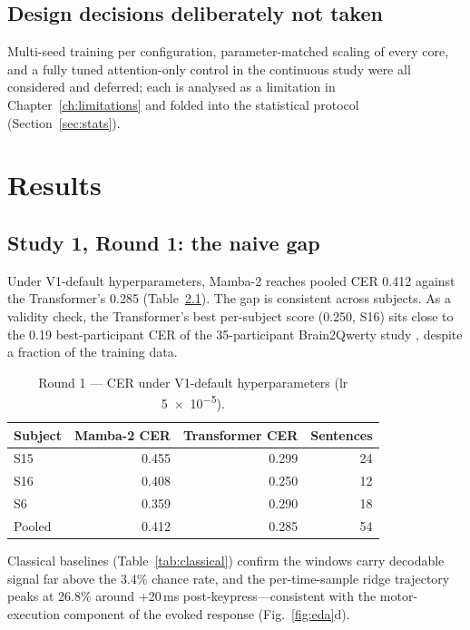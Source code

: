 \documentclass[11pt,a4paper]{report}
\begin{document}
\section{Design decisions deliberately not taken}
Multi-seed training per configuration, parameter-matched scaling of every
core, and a fully tuned attention-only control in the continuous study were
all considered and deferred; each is analysed as a limitation in
Chapter~\ref{ch:limitations} and folded into the statistical protocol
(Section~\ref{sec:stats}).

\chapter{Results}
\label{ch:results}

\section{Study 1, Round 1: the naive gap}
Under V1-default hyperparameters, Mamba-2 reaches pooled CER 0.412 against
the Transformer's 0.285 (Table~\ref{tab:round1}). The gap is consistent
across subjects. As a validity check, the Transformer's best per-subject
score (0.250, S16) sits close to the 0.19 best-participant CER of the
35-participant Brain2Qwerty study \citep{levy2025brain2qwerty}, despite a
fraction of the training data.

\begin{table}[htbp]
\centering
\caption{Round 1 --- CER under V1-default hyperparameters (lr \num{5e-5}).}
\label{tab:round1}
\begin{tabular}{lrrr}
\toprule
Subject & Mamba-2 CER & Transformer CER & Sentences \\
\midrule
S15 & 0.455 & 0.299 & 24 \\
S16 & 0.408 & 0.250 & 12 \\
S6  & 0.359 & 0.290 & 18 \\
\midrule
Pooled & 0.412 & 0.285 & 54 \\
\bottomrule
\end{tabular}
\end{table}

Classical baselines (Table~\ref{tab:classical}) confirm the windows carry
decodable signal far above the 3.4\% chance rate, and the per-time-sample
ridge trajectory peaks at 26.8\% around +20\,ms post-keypress---consistent
with the motor-execution component of the evoked response
(Fig.~\ref{fig:eda}d).
\end{document}
